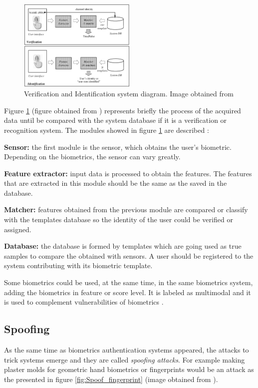\begin{figure}[htb]
\centering
\includegraphics[width=0.5\textwidth]{images_miscelaneus/verif_identif.PNG}
\caption{Verification and Identification system diagram. Image obtained from \cite{Intro_biometrics2}} \label{fig:Verif_ident}
\end{figure}

Figure \ref{fig:Verif_ident} (figure obtained from \cite{Intro_biometrics2}) represents briefly the process of the acquired data until be compared  with the system database if it is a verification or recognition system. The modules showed in figure \ref{fig:Verif_ident} are described \cite{Intro_biometrics2}:
\begin{description}[itemsep=2pt,topsep=8pt,parsep=0pt,partopsep=20pt]
\item \textbf{Sensor:} the first module is the sensor, which obtains the user's biometric. Depending on the biometrics, the sensor can vary greatly.
\item \textbf{Feature extractor:} input data is processed to obtain the features. The features that are extracted in this module should be the same as the saved in the database.
\item \textbf{Matcher:} features obtained from the previous module are compared or classify with the templates database so the identity of the user could be verified or assigned.
\item \textbf{Database:} the database is formed by templates which are going used as true samples to compare the obtained with sensors. A user should be registered to the system contributing with its biometric template.
\end{description}

Some biometrics could be used, at the same time, in the same biometrics system, adding the biometrics in feature or score level. It is labeled as multimodal and it is used to complement vulnerabilities of biometrics \cite{Spoofing_survey}.

\subsection{Spoofing}
As the same time as biometrics authentication systems appeared, the attacks to trick systems emerge and they are called \textit{spoofing attacks}. For example making plaster molds for geometric hand biometrics or fingerprints would be an attack as the presented in figure \ref{fig:Spoof_fingerprint} (image obtained from \cite{fingerprint_image}).\\

